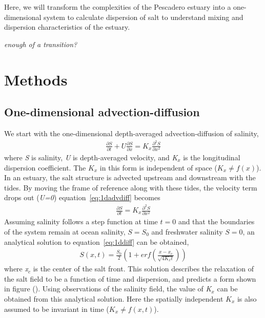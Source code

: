 Here, we will transform the complexities of the Pescadero estuary into a one-dimensional system to calculate dispersion of salt to understand mixing and dispersion characteristics of the estuary.

\emph{enough of a transition?}

\section{Methods} \label{sec:ch4methods}

\subsection{One-dimensional advection-diffusion} \label{ssec:1dadvdif}

We start with the one-dimensional depth-averaged advection-diffusion of salinity,
\begin{eqnarray}
\frac{\partial S}{\partial t} + U\frac{\partial S}{\partial x} = K_x\frac{\partial^2S}{\partial x^2} \label{eq:1dadvdiff}
\end{eqnarray}
where \emph{S} is salinity, \emph{U} is depth-averaged velocity, and \emph{K$_x$} is the longitudinal dispersion coefficient. The $K_x$ in this form is independent of space ($K_x\ne f(x)$).  In an estuary, the salt structure is advected upstream and downstream with the tides. By moving the frame of reference along with these tides, the velocity term drops out (\emph{U=0}) equation~\ref{eq:1dadvdiff} becomes
\begin{eqnarray}
\frac{\partial S}{\partial t} = K_x\frac{\partial^2S}{\partial x^2} \label{eq:1ddiff}
\end{eqnarray}
Assuming salinity follows a step function at time $t=0$ and that the boundaries of the system remain at ocean salinity, $S=S_0$ and freshwater salinity $S=0$, an analytical solution to equation~\ref{eq:1ddiff} can be obtained,
\begin{eqnarray}
S(x,t) = \frac{S_0}{2}\left(1+erf\left(\frac{x-x_c}{\sqrt{4K_xt}}\right)\right) \label{eq:S}
\end{eqnarray}
where \emph{x$_c$} is the center of the salt front. This solution describes the relaxation of the salt field to be a function of time and dispersion, and predicts a form shown in figure (). Using observations of the salinity field, the value of \emph{K$_x$} can be obtained from this analytical solution. Here the spatially independent $K_x$ is also assumed to be invariant in time ($K_x\ne f(x,t)$). 

